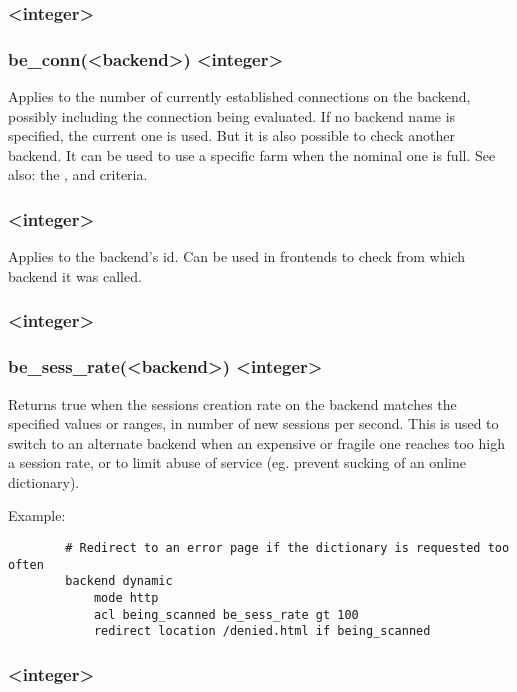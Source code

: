 \subsubsection[be\_conn]{ <integer>}
\subsubsection*{be\_conn(<backend>) <integer>}
  Applies to the number of currently established connections on the backend,
  possibly including the connection being evaluated. If no backend name is
  specified, the current one is used. But it is also possible to check another
  backend. It can be used to use a specific farm when the nominal one is full.
  See also: the ,  and  criteria.

\subsubsection[be\_id]{ <integer>}
  Applies to the backend's id. Can be used in frontends to check from which
  backend it was called.

\subsubsection[be\_sess\_rate]{ <integer>}
\subsubsection*{be\_sess\_rate(<backend>) <integer>}
  Returns true when the sessions creation rate on the backend matches the
  specified values or ranges, in number of new sessions per second. This is
  used to switch to an alternate backend when an expensive or fragile one
  reaches too high a session rate, or to limit abuse of service (eg. prevent
  sucking of an online dictionary).

  Example:
  \begin{verbatim}
        # Redirect to an error page if the dictionary is requested too often
        backend dynamic
            mode http
            acl being_scanned be_sess_rate gt 100
            redirect location /denied.html if being_scanned
  \end{verbatim}

\subsubsection[connslots]{ <integer>}
